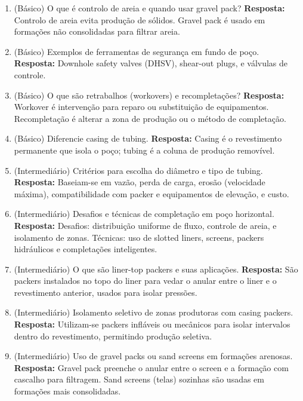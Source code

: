 \documentclass[11pt,a4paper]{article}
\begin{document}
\begin{enumerate}
  \item (Básico) O que é controlo de areia e quando usar gravel pack?
  \textbf{Resposta:} Controlo de areia evita produção de sólidos. Gravel pack é usado em formações não consolidadas para filtrar areia.

  \item (Básico) Exemplos de ferramentas de segurança em fundo de poço.
  \textbf{Resposta:} Downhole safety valves (DHSV), shear-out plugs, e válvulas de controle.

  \item (Básico) O que são retrabalhos (workovers) e recompletações?
  \textbf{Resposta:} Workover é intervenção para reparo ou substituição de equipamentos. Recompletação é alterar a zona de produção ou o método de completação.

  \item (Básico) Diferencie casing de tubing.
  \textbf{Resposta:} Casing é o revestimento permanente que isola o poço; tubing é a coluna de produção removível.

  \item (Intermediário) Critérios para escolha do diâmetro e tipo de tubing.
  \textbf{Resposta:} Baseiam-se em vazão, perda de carga, erosão (velocidade máxima), compatibilidade com packer e equipamentos de elevação, e custo.

  \item (Intermediário) Desafios e técnicas de completação em poço horizontal.
  \textbf{Resposta:} Desafios: distribuição uniforme de fluxo, controle de areia, e isolamento de zonas. Técnicas: uso de slotted liners, screens, packers hidráulicos e completações inteligentes.

  \item (Intermediário) O que são liner-top packers e suas aplicações.
  \textbf{Resposta:} São packers instalados no topo do liner para vedar o anular entre o liner e o revestimento anterior, usados para isolar pressões.

  \item (Intermediário) Isolamento seletivo de zonas produtoras com casing packers.
  \textbf{Resposta:} Utilizam-se packers infláveis ou mecânicos para isolar intervalos dentro do revestimento, permitindo produção seletiva.

  \item (Intermediário) Uso de gravel packs ou sand screens em formações arenosas.
  \textbf{Resposta:} Gravel pack preenche o anular entre o screen e a formação com cascalho para filtragem. Sand screens (telas) sozinhas são usadas em formações mais consolidadas.


\end{enumerate}
\end{document}
